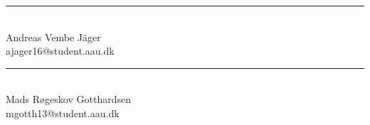 %
%
%
%
%
%


\vspace{1.5\baselineskip}
\begin{minipage}[b]{0.45\textwidth}
 \centering
 \rule{\textwidth}{0.45pt}\\
  Andreas Vembe Jäger\\
 {\footnotesize ajager16@student.aau.dk}
\end{minipage}
\vspace{1.5\baselineskip}
\hfill
\begin{minipage}[b]{0.45\textwidth}
 \centering
 \rule{\textwidth}{0.45pt}\\
  Mads Røgeskov Gotthardsen\\
 {\footnotesize mgotth13@student.aau.dk}
\end{minipage}

